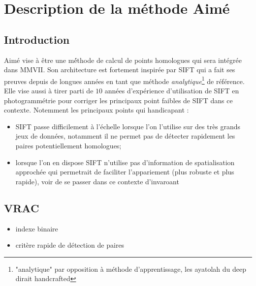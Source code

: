 
\chapter{Description de la méthode Aim\'e}

\section{Introduction}

Aim\'e vise à être une m\'éthode de calcul de points homologues qui sera  intégrée dans MMVII. 
Son architecture est fortement inspirée par SIFT qui a fait ses preuves depuis de longues
années en tant que méthode \emph{analytique}\footnote{"analytique" par opposition à méthode d'apprentissage,
les ayatolah du deep dirait handcrafted} de référence. Elle vise aussi à tirer parti de $10$ années
d'expérience d'utilisation de SIFT en photogrammétrie pour corriger les principaux point faibles
de SIFT dans ce contexte.  Notemment les principaux points qui handicapant :


\begin{itemize}
   \item SIFT passe difficilement à l'échelle lorsque  l'on l'utilise sur des très grands jeux de données,
         notamment il ne permet pas de détecter rapidement les paires potentiellement homologues;

   \item lorsque l'on en dispose SIFT n'utilise pas d'information  de spatialisation approchée qui permetrait
         de faciliter l'appariement (plus robuste et plus rapide), voir de se passer dans ce contexte d'invaroant
\end{itemize}


\section{VRAC}

\begin{itemize}
   \item indexe binaire
    \item critère rapide de détection de paires
\end{itemize}

